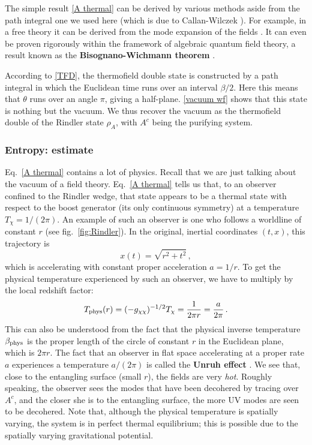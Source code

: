 \documentclass[11pt]{article}
\begin{document}
The simple result \eqref{A thermal} can be derived by various methods aside from the path integral one we used here (which is due to Callan-Wilczek \cite{Callan:1994py}). For example, in a free theory it can be derived from the mode expansion of the fields \cite{PhysRevD.14.870}. It can even be proven rigorously within the framework of algebraic quantum field theory, a result known as the \textbf{Bisognano-Wichmann theorem} \cite{Bisognano:1976za}.

According to \eqref{TFD}, the thermofield double state is constructed by a path integral in which the Euclidean time runs over an interval $\beta/2$. Here this means that $\theta$ runs over an angle $\pi$, giving a half-plane. \eqref{vacuum wf} shows that this state is nothing but the vacuum. We thus recover the vacuum as the thermofield double of the Rindler state $\rho_A$, with $A^c$ being the purifying system.


\subsubsection{Entropy: estimate}
\label{sec:estimate}

Eq.\ \eqref{A thermal} contains a lot of physics. Recall that we are just talking about the vacuum of a field theory. Eq.\ \eqref{A thermal} tells us that, to an observer confined to the Rindler wedge, that state appears to be a thermal state with respect to the boost generator (its only continuous symmetry) at a temperature $T_\chi=1/(2\pi)$. An example of such an observer is one who follows a worldline of constant $r$ (see fig.\ \ref{fig:Rindler}). In the original, inertial coordinates $(t,x)$, this trajectory is
\begin{equation}
x(t) = \sqrt{r^2+t^2}\,,
\end{equation}
which is accelerating with constant proper acceleration $a=1/r$. To get the physical temperature experienced by such an observer, we have to multiply by the local redshift factor:
\begin{equation}\label{Unruh}
T_{\rm phys}(r) = (-g_{\chi\chi})^{-1/2}T_\chi = \frac1{2\pi r}=\frac a{2\pi}\,.
\end{equation}
This can also be understood from the fact that the physical inverse temperature $\beta_{\rm phys}$ is the proper length of the circle of constant $r$ in the Euclidean plane, which is $2\pi r$. The fact that an observer in flat space accelerating at a proper rate $a$ experiences a temperature $a/(2\pi)$ is called the \textbf{Unruh effect} \cite{PhysRevD.14.870}. We see that, close to the entangling surface (small $r$), the fields are very \emph{hot}. Roughly speaking, the observer sees the modes that have been decohered by tracing over $A^c$, and the closer she is to the entangling surface, the more UV modes are seen to be decohered. Note that, although the physical temperature is spatially varying, the system is in perfect thermal equilibrium; this is possible due to the spatially varying gravitational potential.
\end{document}
